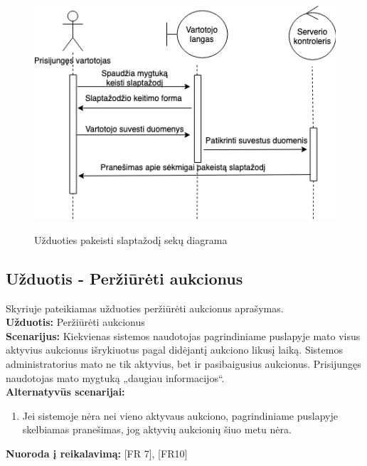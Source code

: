 \documentclass{VUMIFPSkursinis}
\begin{document}
			\begin{figure}[H]
		\centering
		\includegraphics[width=\linewidth]{img/changePasswordSequence.png}
		\label{fig:slaptazodis}
		\caption{Užduoties pakeisti slaptažodį sekų diagrama}
	\end{figure}

	\subsection{Užduotis - Peržiūrėti aukcionus}
	Skyriuje pateikiamas užduoties peržiūrėti aukcionus aprašymas.\\
	\textbf{Užduotis:}  Peržiūrėti aukcionus \\
	\textbf{Scenarijus:} Kiekvienas sistemos naudotojas pagrindiniame puslapyje mato visus aktyvius aukcionus išrykiuotus pagal didėjantį aukciono likusį laiką. Sistemos administratorius mato ne tik aktyvius, bet ir pasibaigusius aukcionus. Prisijungęs naudotojas mato mygtuką „daugiau informacijos“. \\
	\textbf{Alternatyvūs scenarijai:}
	\begin{enumerate}
		\item Jei sistemoje nėra nei vieno aktyvaus aukciono, pagrindiniame puslapyje skelbiamas pranešimas, jog aktyvių aukcionių šiuo metu nėra.
	\end{enumerate}
	\textbf{Nuoroda į reikalavimą: } [FR 7], [FR10]
	
\end{document}
